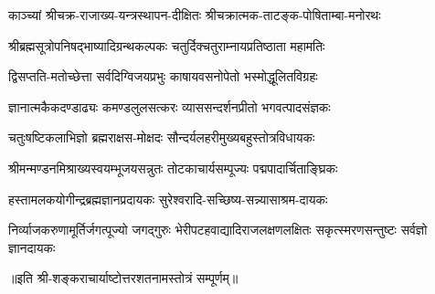 \twolineshloka
{काञ्च्यां श्रीचक्र-राजाख्य-यन्त्रस्थापन-दीक्षितः}
{श्रीचक्रात्मक-ताटङ्क-पोषिताम्बा-मनोरथः}

\twolineshloka
{श्रीब्रह्मसूत्रोपनिषद्भाष्यादिग्रन्थकल्पकः}
{चतुर्दिक्चतुराम्नायप्रतिष्ठाता महामतिः}

\twolineshloka
{द्विसप्तति-मतोच्छेत्ता सर्वदिग्विजयप्रभुः}
{काषायवसनोपेतो भस्मोद्धूलितविग्रहः}

\twolineshloka
{ज्ञानात्मकैकदण्डाढ्यः कमण्डलुलसत्करः}
{व्याससन्दर्शनप्रीतो भगवत्पादसंज्ञकः}

\twolineshloka
{चतुःषष्टिकलाभिज्ञो ब्रह्मराक्षस-मोक्षदः}
{सौन्दर्यलहरीमुख्यबहुस्तोत्रविधायकः}

\twolineshloka
{श्रीमन्मण्डनमिश्राख्यस्वयम्भूजयसन्नुतः}
{तोटकाचार्यसम्पूज्यः पद्मपादार्चिताङ्घ्रिकः}

\twolineshloka
{हस्तामलकयोगीन्द्रब्रह्मज्ञानप्रदायकः}
{सुरेश्वरादि-सच्छिष्य-सन्न्यासाश्रम-दायकः}

\threelineshloka
{निर्व्याजकरुणामूर्तिर्जगत्पूज्यो जगद्गुरुः}
{भेरीपटहवाद्यादिराजलक्षणलक्षितः}
{सकृत्स्मरणसन्तुष्टः सर्वज्ञो ज्ञानदायकः}

॥इति श्री-शङ्कराचार्याष्टोत्तरशतनामस्तोत्रं सम्पूर्णम्॥
